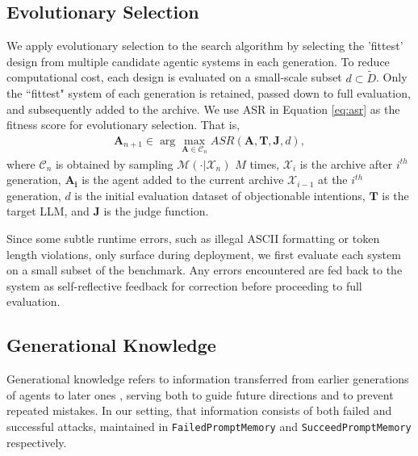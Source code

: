 \vspace{-0.2cm}
\subsection{Evolutionary Selection} 
\label{method:evolutionary_pressure}
We apply evolutionary selection to the search algorithm by selecting the 'fittest' design from multiple candidate agentic systems in each generation. To reduce computational cost, each design is evaluated on a small-scale subset $d\subset \tilde D$. Only the ``fittest" system of each generation is retained, passed down to full evaluation, and subsequently added to the archive. We use ASR in Equation \ref{eq:asr} as the fitness score for evolutionary selection. That is,
\begin{align}
\label{eq:selection}
    \boldsymbol{A}_{n+1} \in 
    \arg\max_{\boldsymbol A \in \mathcal C_n}ASR(\boldsymbol A, \boldsymbol{T}, \boldsymbol{J}, d),
\end{align}
where $\mathcal C_n$ is obtained by sampling $\mathcal M(\cdot|\mathcal X_n)$ $M$ times, $\mathcal X_i$ is the archive after $i^{th}$ generation,  $\boldsymbol{A_i}$ is the agent added to the current archive $\mathcal X_{i-1}$ at the $i^{th}$ generation, $d$ is the initial evaluation dataset of objectionable intentions, $\boldsymbol{T}$ is the target LLM, and $\boldsymbol{J}$ is the judge function.

Since some subtle runtime errors, such as illegal ASCII formatting or token length violations, only surface during deployment, we first evaluate each system on a small subset of the benchmark. Any errors encountered are fed back to the system as self-reflective feedback for correction before proceeding to full evaluation.
 

\subsection{Generational Knowledge} 
\label{method:generational knowledge}
Generational knowledge refers to information transferred from earlier generations of agents to later ones \citep{83de36be-2c3e-320a-8208-9cd092458307}, serving both to guide future directions and to prevent repeated mistakes. In our setting, that information consists of both failed and successful attacks, maintained in \texttt{FailedPromptMemory} and \texttt{SucceedPromptMemory} respectively.

